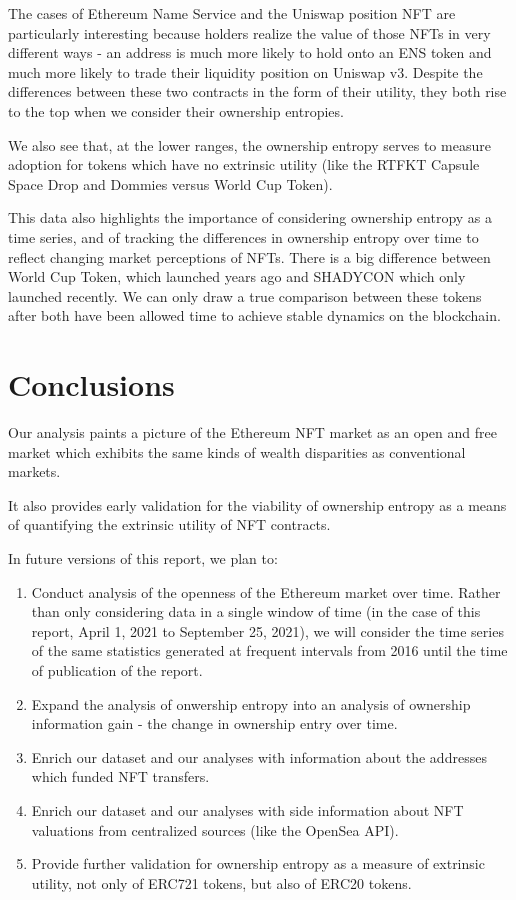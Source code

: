\documentclass{article}
\begin{document}
The cases of Ethereum Name Service and the Uniswap position NFT are particularly interesting because holders realize the value of those NFTs in very different ways - an address is much more likely to hold onto an ENS token and much more likely to trade their liquidity position on Uniswap v3. Despite the differences between these two contracts in the form of their utility, they both rise to the top when we consider their ownership entropies.

We also see that, at the lower ranges, the ownership entropy serves to measure adoption for tokens which have no extrinsic utility (like the RTFKT Capsule Space Drop and Dommies versus World Cup Token).

This data also highlights the importance of considering ownership entropy as a time series, and of tracking the differences in ownership entropy over time to reflect changing market perceptions of NFTs. There is a big difference between World Cup Token, which launched years ago and SHADYCON which only launched recently. We can only draw a true comparison between these tokens after both have been allowed time to achieve stable dynamics on the blockchain.

\section{Conclusions}

Our analysis paints a picture of the Ethereum NFT market as an open and free market which exhibits the same kinds of wealth disparities as conventional markets.

It also provides early validation for the viability of ownership entropy as a means of quantifying the extrinsic utility of NFT contracts.

In future versions of this report, we plan to:
\begin{enumerate}
\item{Conduct analysis of the openness of the Ethereum market over time. Rather than only considering data in a single window of time (in the case of this report, April 1, 2021 to September 25, 2021), we will consider the time series of the same statistics generated at frequent intervals from 2016 until the time of publication of the report.}
\item{Expand the analysis of onwership entropy into an analysis of ownership information gain - the change in ownership entry over time.}
\item{Enrich our dataset and our analyses with information about the addresses which funded NFT transfers.}
\item{Enrich our dataset and our analyses with side information about NFT valuations from centralized sources (like the OpenSea API).}
\item{ Provide further validation for ownership entropy as a measure of extrinsic utility, not only of ERC721 tokens, but also of ERC20 tokens.}
\end{enumerate}
\end{document}
